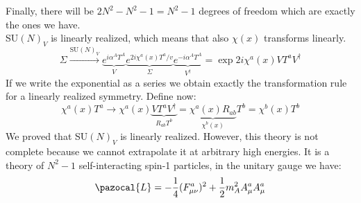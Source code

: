 \documentclass[../main.tex]{subfiles}
\begin{document}
Finally, there will be $2N^2-N^2-1=N^2-1$ degrees of freedom which are exactly the ones we have.\\
SU$(N)_V$ is linearly realized, which means that also $\chi(x)$ transforms linearly.
\[
\Sigma\xrightarrow[]{\text{SU}(N)_V}\underbrace{e^{i\alpha^AT^A}}_{V}\underbrace{e^{2i\chi^a(x)T^a/v}}_{\Sigma}\underbrace{e^{-i\alpha^AT^A}}_{V^\dagger}=\exp{2i\chi^a(x)VT^aV^\dagger}
\]
If we write the exponential as a series we obtain exactly the transformation rule for a linearly realized symmetry. Define now:
\[
\chi^a(x)T^a\to\chi^a(x)\underbrace{VT^aV^\dagger}_{R_{ab}T^b}=\underbrace{\chi^a(x)R_{ab}}_{\chi^b(x)}T^b=\chi^b(x)T^b
\]
We proved that SU$(N)_V$ is linearly realized. However, this theory is not complete because we cannot extrapolate it at arbitrary high energies. It is a theory of $N^2-1$ self-interacting spin-1 particles, in the unitary gauge we have:
\[
\pazocal{L}=-\frac{1}{4}(F_{\mu\nu}^a)^2+\frac{1}{2}m_A^2A_\mu^aA_\mu^a
\]
\end{document}
